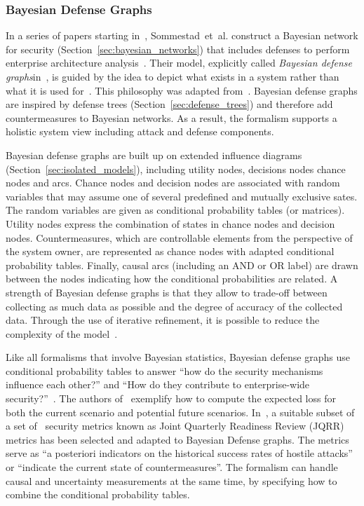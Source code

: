 \documentclass[a4paper]{article}
\begin{document}
\subsubsection{Bayesian Defense Graphs} 
\label{sec:bayesian_defense_graphs}

In a series of papers starting in~, Sommestad~et~al. construct a Bayesian
network for security (Section~\ref{sec:bayesian_networks}) that includes
defenses to perform enterprise architecture
analysis~\cite{FrSoEkJo,SoEkJo4,SoEkJo2,EkSo,SoEkNo}. Their model, explicitly
called \emph{Bayesian defense graphs}in~\cite{SoEkJo2}, is guided by the idea to
depict what exists in a system rather than what it is used for~\cite{SoEkJo2}.
This philosophy was adapted from~\cite{JoJoSoUl}. Bayesian defense graphs are
inspired by defense trees (Section~\ref{sec:defense_trees}) and therefore add
countermeasures to Bayesian networks. As a result, the formalism supports a
holistic system view including attack and defense components.

Bayesian defense graphs are built up on extended influence diagrams
(Section~\ref{sec:isolated_models}), including utility nodes, decisions nodes
chance nodes and arcs. Chance nodes and decision nodes are associated with
random variables that may assume one of several predefined and mutually
exclusive sates. The random variables are given as conditional probability
tables (or matrices). Utility nodes express the combination of states in chance
nodes and decision nodes. Countermeasures, which are controllable elements from
the perspective of the system owner, are represented as chance nodes with
adapted conditional probability tables. Finally, causal arcs (including an AND
or OR label) are drawn between the nodes indicating how the conditional
probabilities are related. A strength of Bayesian defense graphs is that they
allow to trade-off between collecting as much data as possible and the degree of
accuracy of the collected data. Through the use of iterative refinement, it is
possible to reduce the complexity of the model~\cite{SoEkJo2}. 

Like all formalisms that involve Bayesian statistics, Bayesian defense graphs 
use conditional probability tables to answer ``how do the security mechanisms
influence each other?'' and ``How do they contribute to enterprise-wide
security?''~\cite{SoEkJo4}. The authors of~\cite{SoEkJo4} exemplify how to 
compute the expected loss for both the current scenario and potential future 
scenarios. In~\cite{FrSoEkJo}, a suitable subset of a set of~ security 
metrics known as Joint Quarterly Readiness Review (JQRR) metrics has been 
selected and adapted to Bayesian Defense graphs. The metrics serve as ``a 
posteriori indicators on the historical success rates of hostile attacks'' or 
``indicate the current state of countermeasures''. The formalism can handle 
causal and uncertainty measurements at the same time, by specifying how to 
combine the conditional probability tables.
\end{document}
